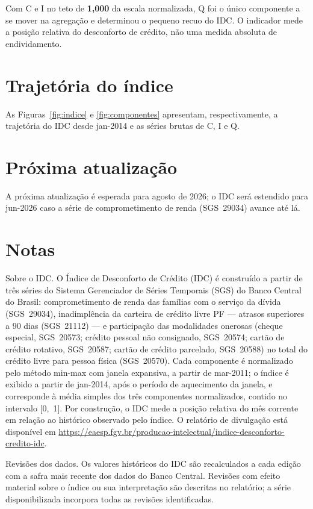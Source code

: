 \documentclass[11pt,a4paper]{article}
\newcommand{\proxdivulgacao}{agosto de 2026}
\newcommand{\mesproximo}{jun-2026}
\newcommand{\janelainicio}{jan-2014}   %
\newcommand{\seriesinicio}{mar-2011}   %
\begin{document}
Com C e I no teto de \textbf{1,000} da escala normalizada, Q foi o único componente
a se mover na agregação e determinou o pequeno recuo do IDC. O indicador mede a
posição relativa do desconforto de crédito, não uma medida absoluta de endividamento.

\section{Trajetória do índice}

As Figuras~\ref{fig:indice} e \ref{fig:componentes} apresentam, respectivamente, a
trajetória do IDC desde \janelainicio{} e as séries brutas de C, I e Q.
\section{Próxima atualização}

A próxima atualização é esperada para \proxdivulgacao; o IDC será estendido para
\mesproximo{} caso a série de comprometimento de renda (SGS~29034) avance até lá.

\section*{Notas}

\begingroup\footnotesize

Sobre o IDC. O Índice de Desconforto de Crédito (IDC) é construído a partir de
três séries do Sistema Gerenciador de Séries Temporais (SGS) do Banco Central do Brasil:
comprometimento de renda das famílias com o serviço da dívida (SGS~29034), inadimplência
da carteira de crédito livre PF --- atrasos superiores a 90 dias (SGS~21112) --- e
participação das modalidades onerosas (cheque especial, SGS~20573; crédito pessoal não
consignado, SGS~20574; cartão de crédito rotativo, SGS~20587; cartão de crédito parcelado,
SGS~20588) no total do crédito livre para pessoa física (SGS~20570). Cada componente é
normalizado pelo método min-max com janela expansiva, a partir de \seriesinicio; o índice
é exibido a partir de \janelainicio, após o período de aquecimento da janela, e corresponde
à média simples dos três componentes normalizados, contido no intervalo [0,~1]. Por
construção, o IDC mede a posição relativa do mês corrente em relação ao histórico observado
pelo índice. O relatório de divulgação está disponível em
\url{https://eaesp.fgv.br/producao-intelectual/indice-desconforto-credito-idc}.

Revisões dos dados. Os valores históricos do IDC são recalculados a cada edição
com a safra mais recente dos dados do Banco Central. Revisões com efeito material
sobre o índice ou sua interpretação são descritas no relatório; a série
disponibilizada incorpora todas as revisões identificadas.
\end{document}

